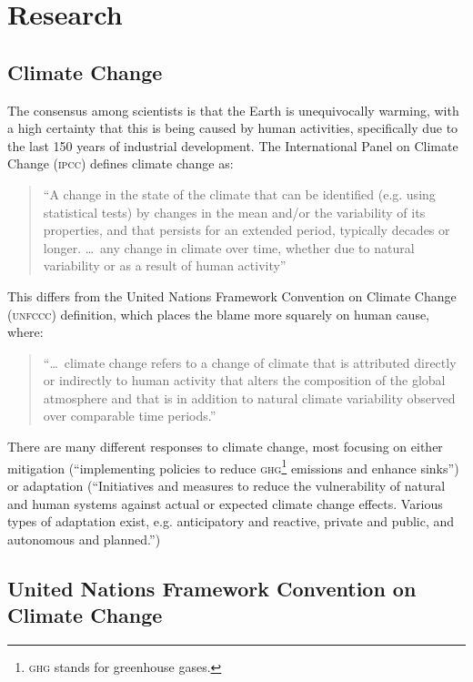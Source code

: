 \section{Research}
\subsection{Climate Change}
The consensus among scientists is that the Earth is unequivocally warming, with a high certainty that this is being caused by human activities, specifically due to the last 150 years of industrial development. The International Panel on Climate Change (\textsc{ipcc}) defines climate change as:

\begin{quote}
``A change in the state of the climate that can be identified (e.g. using statistical tests) by changes in the mean and/or the variability of its properties, and that persists for an extended period, typically decades or longer. \ldots~any change in climate over time, whether due to natural variability or as a result of human activity''~\cite{IPCC-synthesis-07}
\end{quote}

This differs from the United Nations Framework Convention on Climate Change (\textsc{unfccc}) definition, which places the blame more squarely on human cause, where:

\begin{quote}
``\ldots~climate change refers to a change of climate that is attributed directly or indirectly to human activity that alters the composition of the global atmosphere and that is in addition to natural climate variability observed over comparable time periods.''~\cite{IPCC-synthesis-07}
\end{quote}

There are many different responses to climate change, most focusing on either mitigation (``implementing policies to reduce \textsc{ghg}\footnote{\textsc{ghg} stands for greenhouse gases.} emissions and enhance sinks'')~\cite{IPCC-glossary-mitigation} or adaptation (``Initiatives and measures to reduce the vulnerability of natural and human systems against actual or expected climate change effects. Various types of adaptation exist, e.g. anticipatory and reactive, private and public, and autonomous and planned.'')~\cite{IPCC-glossary-adaptation}

\subsection{United Nations Framework Convention on Climate Change}

